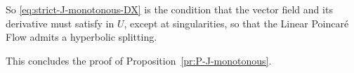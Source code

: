 \documentclass[12pt,reqno]{amsart}
\numberwithin{equation}{section}
\theoremstyle{plain}
\theoremstyle{definition}
\newcommand{\J}{\EuScript{J}}
\begin{document}
So \eqref{eq:strict-J-monotonous-DX} is the condition that
the vector field and its derivative must satisfy in $U$,
except at singularities, so that the Linear Poincar\'e Flow
admits a hyperbolic splitting.

This concludes the proof of
Proposition~\ref{pr:P-J-monotonous}.










\end{document}
